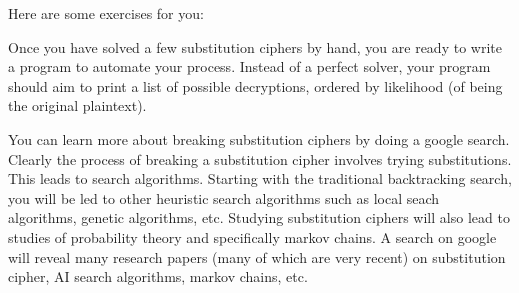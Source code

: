 Here are some exercises for you:





Once you have solved a few substitution ciphers by hand,
you are ready
to write a program to automate your process.
Instead of a perfect solver,
your program should aim to print a list of
possible decryptions, ordered by likelihood (of being the original plaintext).

You can learn more about breaking substitution ciphers by doing a
google search.
Clearly the process of breaking a substitution cipher involves trying
substitutions.
This leads to search algorithms.
Starting with the traditional backtracking search, you
will be led to other heuristic search algorithms
such as local seach algorithms, genetic algorithms, etc.
Studying substitution ciphers will also lead to studies of
probability theory and specifically markov chains.
A search on google will reveal many research papers
(many of which are very recent)
on substitution cipher, AI search algorithms,
markov chains, etc.



